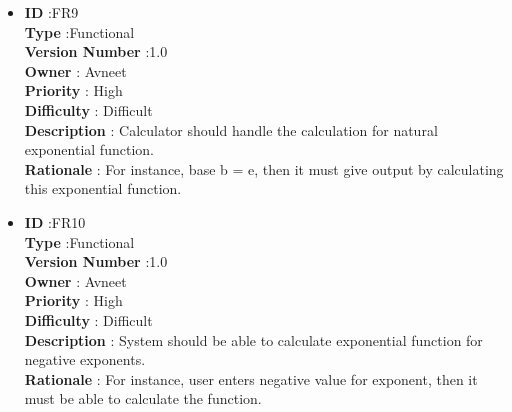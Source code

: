 \documentclass[a4paper,12pt]{report}
\begin{document}
\begin{itemize}
	\item
    \textbf{ID } \hspace{3cm} :FR9  \\
	\textbf{Type } \hspace{2.4cm}  :Functional\\
	\textbf{Version Number} \hspace{0.3cm} :1.0  \\
	\textbf{Owner } \hspace{1.98cm} : Avneet \\
	\textbf{Priority } \hspace{1.75cm} : High\\
	\textbf{Difficulty } \hspace{1.5cm} : Difficult\\
	\textbf{Description }\hspace{1.2cm} : Calculator should handle the calculation for natural exponential function.\\
	\textbf{Rationale }\hspace{1.6cm} : For instance, base b = e, then it must give output by calculating this exponential function.\\

	\item
    \textbf{ID } \hspace{3cm} :FR10  \\
	\textbf{Type } \hspace{2.4cm}  :Functional\\
	\textbf{Version Number} \hspace{0.3cm} :1.0  \\
	\textbf{Owner } \hspace{1.98cm} : Avneet \\
	\textbf{Priority } \hspace{1.75cm} : High\\
	\textbf{Difficulty } \hspace{1.5cm} : Difficult\\
	\textbf{Description }\hspace{1.2cm} : System should be able to calculate exponential function for negative exponents.\\
	\textbf{Rationale }\hspace{1.6cm} : For instance, user enters negative value for exponent, then it must be able to calculate the function.\\


\end{itemize}
\end{document}
